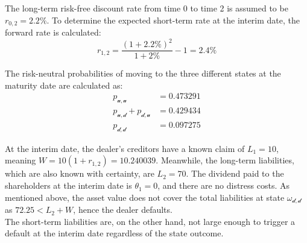 \documentclass[main.tex]{subfiles}
\begin{document}
        The long-term risk-free discount rate from time 0 to time 2 is assumed to be $r_{0,2}=2.2\%$.
        To determine the expected short-term rate at the interim date, the forward rate is calculated:
        \begin{equation*}
            r_{1,2} =
                \frac{
                    \left(1 + 2.2\%\right)^{2}
                }{
                    1 + 2\%
                }
            - 1
            = 2.4\%
        \end{equation*}
        
        The risk-neutral probabilities of moving to the three different states at the maturity date are calculated as:
        \begin{align*}
            p_{\mathscr{u},\mathscr{u}}
            &=
            \num{0.473291}
            \\
            p_{\mathscr{u},\mathscr{d}} +
            p_{\mathscr{d},\mathscr{u}}
            &=
            \num{0.429434}
            \\
            p_{\mathscr{d},\mathscr{d}}
            &=
            \num{0.097275}
        \end{align*}

        At the interim date, the dealer's creditors have a known claim of $L_{1} = 10$,
        meaning $W=10(1+r_{1,2})=\num{10.240039}$.
        Meanwhile, the long-term liabilities, which are also known with certainty, are $L_{2} = 70$.
        The dividend paid to the shareholders at the interim date is $\theta_1 = 0$, and there are no distress costs.
        As mentioned above, the asset value does not cover the total liabilities at state $\omega_{\mathscr{d},\mathscr{d}}$ as $72.25 < L_{2} + W$,
        hence the dealer defaults.
        \\
        The short-term liabilities are, on the other hand, not large enough to trigger a default at the interim date
        regardless of the state outcome.
\end{document}
